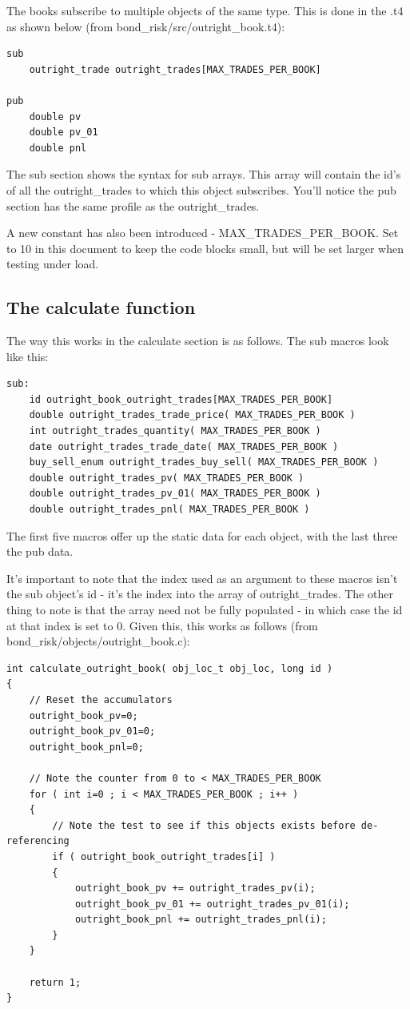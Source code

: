 \documentclass{report}
\begin{document}
The books subscribe to multiple objects of the same type. This is done in the .t4 as shown below (from bond_risk/src/outright_book.t4):

\begin{verbatim}
sub
    outright_trade outright_trades[MAX_TRADES_PER_BOOK]

pub
    double pv
    double pv_01
    double pnl
\end{verbatim}

The sub section shows the syntax for sub arrays. This array will contain the id's of all the outright_trades to which this object subscribes. You'll notice the pub section has the same profile as the outright_trades.

A new constant has also been introduced - MAX_TRADES_PER_BOOK. Set to 10 in this document to keep the code blocks small, but will be set larger when testing under load.

\subsection{The calculate function}

The way this works in the calculate section is as follows. The sub macros look like this:

\begin{verbatim}
sub:
    id outright_book_outright_trades[MAX_TRADES_PER_BOOK]
    double outright_trades_trade_price( MAX_TRADES_PER_BOOK )
    int outright_trades_quantity( MAX_TRADES_PER_BOOK )
    date outright_trades_trade_date( MAX_TRADES_PER_BOOK )
    buy_sell_enum outright_trades_buy_sell( MAX_TRADES_PER_BOOK )
    double outright_trades_pv( MAX_TRADES_PER_BOOK )
    double outright_trades_pv_01( MAX_TRADES_PER_BOOK )
    double outright_trades_pnl( MAX_TRADES_PER_BOOK )
\end{verbatim}

The first five macros offer up the static data for each object, with the last three the pub data.

It's important to note that the index used as an argument to these macros isn't the sub object's id - it's the index into the array of outright_trades. The other thing to note is that the array need not be fully populated - in which case the id at that index is set to 0. Given this, this works as follows (from bond_risk/objects/outright_book.c):

\begin{verbatim}
int calculate_outright_book( obj_loc_t obj_loc, long id )
{
    // Reset the accumulators
    outright_book_pv=0;
    outright_book_pv_01=0;
    outright_book_pnl=0;

    // Note the counter from 0 to < MAX_TRADES_PER_BOOK
    for ( int i=0 ; i < MAX_TRADES_PER_BOOK ; i++ )
    {
        // Note the test to see if this objects exists before de-referencing
        if ( outright_book_outright_trades[i] )
        {
            outright_book_pv += outright_trades_pv(i);
            outright_book_pv_01 += outright_trades_pv_01(i);
            outright_book_pnl += outright_trades_pnl(i);
        }
    }

    return 1;
}
\end{verbatim}
\end{document}
